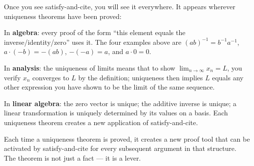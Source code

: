 \begin{remark}
Once you see satisfy-and-cite, you will see it everywhere. It appears
wherever uniqueness theorems have been proved:

\medskip
\noindent In \textbf{algebra}: every proof of the form ``this element equals
the inverse/identity/zero'' uses it. The four examples above are
$(ab)^{-1} = b^{-1}a^{-1}$, $a \cdot (-b) = -(ab)$, $-(-a) = a$,
and $a \cdot 0 = 0$.

\noindent In \textbf{analysis}: the uniqueness of limits means that to
show $\lim_{n \to \infty} x_n = L$, you verify $x_n$ converges to $L$
by the definition; uniqueness then implies $L$ equals any other
expression you have shown to be the limit of the same sequence.

\noindent In \textbf{linear algebra}: the zero vector is unique; the
additive inverse is unique; a linear transformation is uniquely determined
by its values on a basis. Each uniqueness theorem creates a new application
of satisfy-and-cite.

\medskip
\noindent
Each time a uniqueness theorem is proved, it creates a new proof tool
that can be activated by satisfy-and-cite for every subsequent argument
in that structure. The theorem is not just a fact --- it is a lever.
\end{remark}
